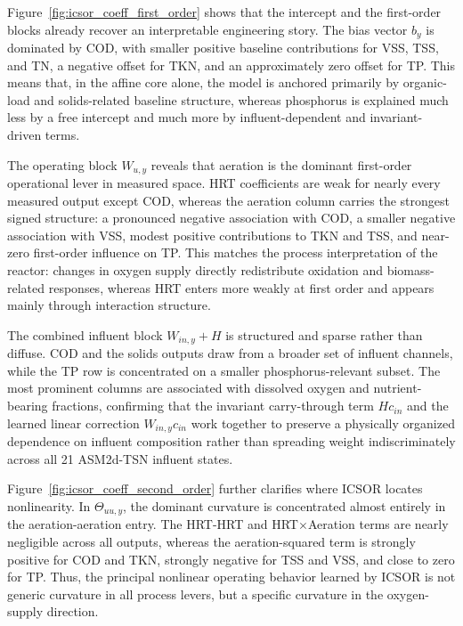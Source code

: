 \documentclass[11pt]{article}
\begin{document}
Figure~\ref{fig:icsor_coeff_first_order} shows that the intercept and the first-order blocks already recover an interpretable engineering story. The bias vector $b_y$ is dominated by COD, with smaller positive baseline contributions for VSS, TSS, and TN, a negative offset for TKN, and an approximately zero offset for TP. This means that, in the affine core alone, the model is anchored primarily by organic-load and solids-related baseline structure, whereas phosphorus is explained much less by a free intercept and much more by influent-dependent and invariant-driven terms.

The operating block $W_{u,y}$ reveals that aeration is the dominant first-order operational lever in measured space. HRT coefficients are weak for nearly every measured output except COD, whereas the aeration column carries the strongest signed structure: a pronounced negative association with COD, a smaller negative association with VSS, modest positive contributions to TKN and TSS, and near-zero first-order influence on TP. This matches the process interpretation of the reactor: changes in oxygen supply directly redistribute oxidation and biomass-related responses, whereas HRT enters more weakly at first order and appears mainly through interaction structure.

The combined influent block $W_{in,y} + H$ is structured and sparse rather than diffuse. COD and the solids outputs draw from a broader set of influent channels, while the TP row is concentrated on a smaller phosphorus-relevant subset. The most prominent columns are associated with dissolved oxygen and nutrient-bearing fractions, confirming that the invariant carry-through term $Hc_{in}$ and the learned linear correction $W_{in,y}c_{in}$ work together to preserve a physically organized dependence on influent composition rather than spreading weight indiscriminately across all 21 ASM2d-TSN influent states.

Figure~\ref{fig:icsor_coeff_second_order} further clarifies where ICSOR locates nonlinearity. In $\Theta_{uu,y}$, the dominant curvature is concentrated almost entirely in the aeration-aeration entry. The HRT-HRT and HRT$\times$Aeration terms are nearly negligible across all outputs, whereas the aeration-squared term is strongly positive for COD and TKN, strongly negative for TSS and VSS, and close to zero for TP. Thus, the principal nonlinear operating behavior learned by ICSOR is not generic curvature in all process levers, but a specific curvature in the oxygen-supply direction.
\end{document}
